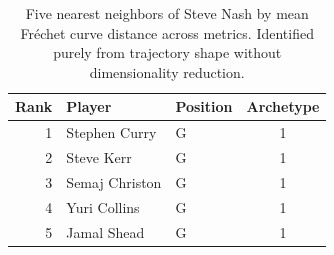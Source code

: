 \begin{table}[htbp]
  \centering\small
  \begin{tabular}{rllc}
    \toprule
    Rank & Player & Position & Archetype \\
    \midrule
    1 & Stephen Curry & G & 1 \\
    2 & Steve Kerr & G & 1 \\
    3 & Semaj Christon & G & 1 \\
    4 & Yuri Collins & G & 1 \\
    5 & Jamal Shead & G & 1 \\
    \bottomrule
  \end{tabular}
  \caption{Five nearest neighbors of Steve Nash by mean Fr\'{e}chet curve distance across metrics. Identified purely from trajectory shape without dimensionality reduction.}
  \label{tab:Steve_Nash_frechet_curve_neighbors}
\end{table}

